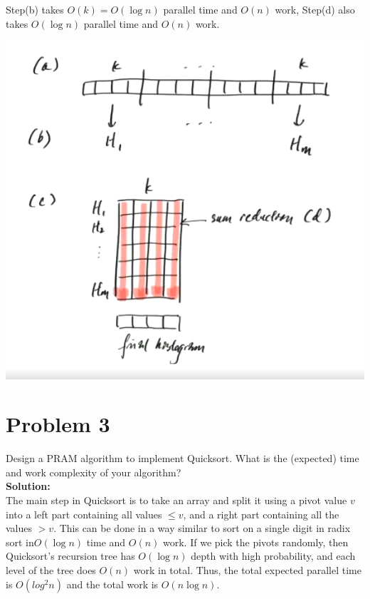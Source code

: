 \documentclass{article}
\begin{document}
Step(b) takes $O(k)=O(\log n)$ parallel time and $O(n)$ work, Step(d) also takes $O(\log n)$ parallel time and $O(n)$ work. 
\begin{center}
    \includegraphics[scale = 0.3]{3.png}
\end{center}

\section{Problem 3}
Design a PRAM algorithm to implement Quicksort. What is the (expected) time 
and work complexity of your algorithm?
\\\textbf{Solution: }\\
The main step in Quicksort is to take an array and split it using a pivot value $v$ into a left part containing all values $\leq v$, and a right part containing all the values $>v$. This can be done in a way similar to sort on a single digit in radix sort in$O(\log n)$ time and $O(n)$ work. If we pick the pivots randomly, then Quicksort's recursion tree has $O(\log n)$ depth with high probability, and each level of the tree does $O(n)$ work in total. Thus, the total expected parallel time is $O(log^2 n)$ and the total work is $O(n\log n)$.
\end{document}
